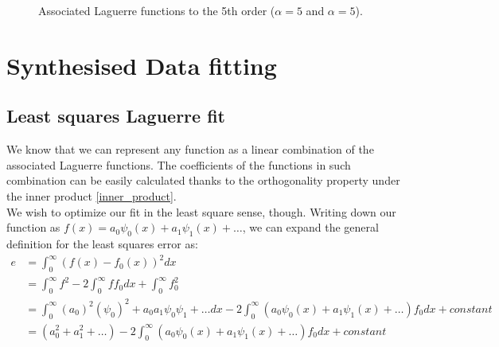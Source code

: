 \documentclass[a4paper]{article}
\numberwithin{equation}{section}
\begin{document}
\begin{figure}[!ht]
  \centering
  \quad
  \caption{Associated Laguerre functions to the 5th order ($\alpha=5$ and $\alpha=5$).}
  \label{fig:associatedlaguerre}
\end{figure}

\section{Synthesised Data fitting}

\subsection{Least squares Laguerre fit}
We know that we can represent any function as a linear combination of the associated Laguerre functions. The coefficients of the functions in such combination can be easily calculated thanks to the orthogonality property under the inner product \ref{inner_product}.\\
We wish to optimize our fit in the least square sense, though. Writing down our function as $f(x)=a_0\psi_0(x)+a_1\psi_1(x)+\ldots$, we can expand the general definition for the least squares error as:
\begin{align}
e &= \int_{0}^{\infty} (f(x)-f_0(x))^2dx \\
  &= \int_{0}^{\infty} f^2 - 2 \int_{0}^{\infty} f f_0 dx + \int_{0}^{\infty} f_0^2 \\
  &= \int_{0}^{\infty} (a_0)^2(\psi_0)^2 + a_0a_1\psi_0\psi_1 + \ldots dx - 2 \int_{0}^{\infty} (a_0\psi_0(x)+a_1\psi_1(x)+\ldots)f_0 dx + constant \\
  &= (a_0^2+a_1^2+\ldots) - 2 \int_{0}^{\infty} (a_0\psi_0(x)+a_1\psi_1(x)+\ldots)f_0 dx + constant
\end{align}
\end{document}
